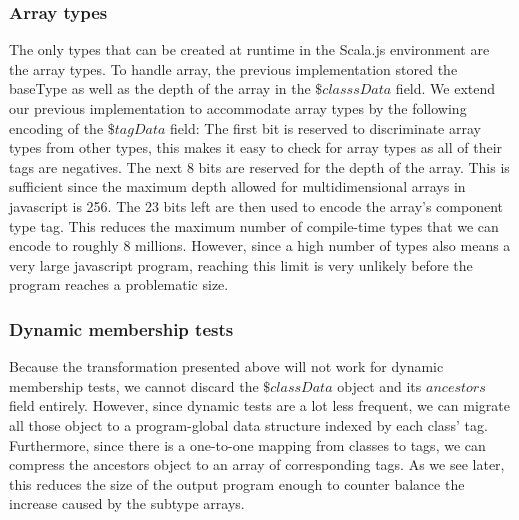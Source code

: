 \subsubsection{Array types}
The only types that can be created at runtime in the Scala.js environment are
the array types. To handle array, the previous implementation stored the
baseType as well as the depth of the array in the $\$classsData$ field. We
extend our previous implementation to accommodate array types by the following
encoding of the $\$tagData$ field: The first bit is reserved to discriminate
array types from other types, this makes it easy to check for array types as
all of their tags are negatives. The next 8 bits are reserved for the depth of
the array. This is sufficient since the maximum depth allowed for
multidimensional arrays in javascript is 256. The 23 bits left are then
used to encode the array's component type tag. This reduces the maximum number
of compile-time types that we can encode to roughly 8 millions. However, since
a high number of types also means a very large javascript program, reaching
this limit is very unlikely before the program reaches a problematic size.

\subsubsection{Dynamic membership tests}
Because the transformation presented above will not work for dynamic membership
tests, we cannot discard the $\$classData$ object and its $ancestors$ field
entirely. However, since dynamic tests are a lot less frequent, we can migrate
all those object to a program-global data structure indexed by each class' tag.
Furthermore, since there is a one-to-one mapping from classes to tags, we can
compress the ancestors object to an array of corresponding tags. As we see
later, this reduces the size of the output program enough to counter balance
the increase caused by the subtype arrays.



